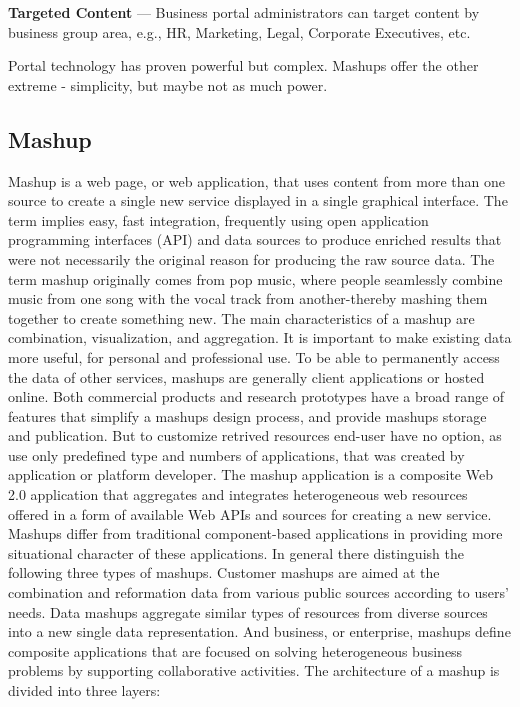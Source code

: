		\textbf{Targeted Content} — Business portal administrators can target content by business group area, e.g., HR, Marketing, Legal, Corporate Executives, etc.

		Portal technology has proven powerful but complex. Mashups offer the other extreme - simplicity, but maybe not as much power. 

	\subsection{Mashup}

		Mashup is a web page, or web application, that uses content from more than one source to create a single new service displayed in a single graphical interface. The term implies easy, fast integration, frequently using open application programming interfaces (API) and data sources to produce enriched results that were not necessarily the original reason for producing the raw source data. The term mashup originally comes from pop music, where people seamlessly combine music from one song with the vocal track from another-thereby mashing them together to create something new. The main characteristics of a mashup are combination, visualization, and aggregation. It is important to make existing data more useful, for personal and professional use. To be able to permanently access the data of other services, mashups are generally client applications or hosted online. Both commercial products and research prototypes have a broad range of features that simplify a mashups design process, and provide mashups storage and publication. But to customize retrived resources end-user have no option, as use only predefined type and numbers of applications, that was created by application or platform developer. 
		The mashup application is a composite Web 2.0 application that aggregates and integrates heterogeneous web resources offered in a form of available Web APIs and sources for creating a new service. Mashups differ from traditional component-based applications in providing more situational character of these applications\cite{yu2008understanding}. In general there distinguish the following three types of mashups\cite{ibrahim2012framework}. Customer mashups are aimed at the combination and reformation data from various public sources according to users’ needs. Data mashups aggregate similar types of resources from diverse sources into a new single data representation. And business, or enterprise, mashups define composite applications that are focused on solving heterogeneous business problems by supporting collaborative activities\cite{hoyer2008enterprise}. The architecture of a mashup is divided into three layers:
